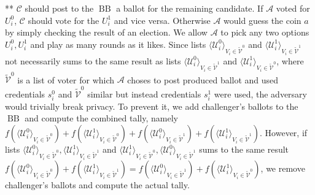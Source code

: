 \documentclass[12pt]{article}
\DeclareMathOperator{\bb}{BB}
\begin{document}
** $\mathcal{C}$ should post to the $\bb$ a ballot for the remaining candidate. If  $\mathcal{A}$  voted for $U_i^0$, $\mathcal{C}$ should vote for the $U_i^1$ and vice versa. Otherwise  $\mathcal{A}$  would guess the coin $a$ by simply checking the result of an election. We allow $\mathcal{A}$ to pick any two options $U_i^0,U_i^1$  and play as many rounds as it likes. Since lists $\langle \mathcal{U}^0_i \rangle _{V_i \in \tilde{\mathcal{V}}^0} $ and  $\langle \mathcal{U}^1_i \rangle _{V_i \in \tilde{\mathcal{V}}^1} $  not necessarily  sums to  the same result as lists  $\langle \mathcal{U}^0_i \rangle _{V_i \in \tilde{\mathcal{V}}^1} $ and  $\langle \mathcal{U}^1_i \rangle _{V_i \in \tilde{\mathcal{V}}^0} $, where $ \tilde{\mathcal{V}}^0$ is a list of voter for which $\mathcal{A}$ choses to post produced ballot and used credentials $s_i^0$ and $ \tilde{\mathcal{V}}^0$ similar but instead credentials $s_i^1$ were used, the adversary would trivially break privacy. To prevent it, we add challenger's ballots to the $\bb$ and compute the combined tally, namely $f(\langle \mathcal{U}^0_i \rangle _{V_i \in \tilde{\mathcal{V}}^0} ) + f(\langle \mathcal{U}^1_i \rangle _{V_i \in \tilde{\mathcal{V}}^0} )+ f(\langle \mathcal{U}^0_i \rangle _{V_i \in \tilde{\mathcal{V}}^1} ) +  f(\langle \mathcal{U}^1_i \rangle _{V_i \in \tilde{\mathcal{V}}^1} )$. However, if lists $\langle \mathcal{U}^0_i \rangle _{V_i \in \tilde{\mathcal{V}}^0}, \langle \mathcal{U}^1_i \rangle _{V_i \in \tilde{\mathcal{V}}^1}$ and $\langle \mathcal{U}^1_i \rangle _{V_i \in \tilde{\mathcal{V}}^0}, \langle \mathcal{U}^0_i \rangle _{V_i \in \tilde{\mathcal{V}}^1}$ sums to the same result $f(\langle \mathcal{U}^0_i \rangle _{V_i \in \tilde{\mathcal{V}}^0} ) + f(\langle \mathcal{U}^1_i \rangle _{V_i \in \tilde{\mathcal{V}}^1} ) =  f(\langle \mathcal{U}^0_i \rangle _{V_i \in \tilde{\mathcal{V}}^1} ) +  f(\langle \mathcal{U}^1_i \rangle _{V_i \in \tilde{\mathcal{V}}^0} )$, we remove challenger's ballots and compute the actual tally. \\\\
\end{document}
